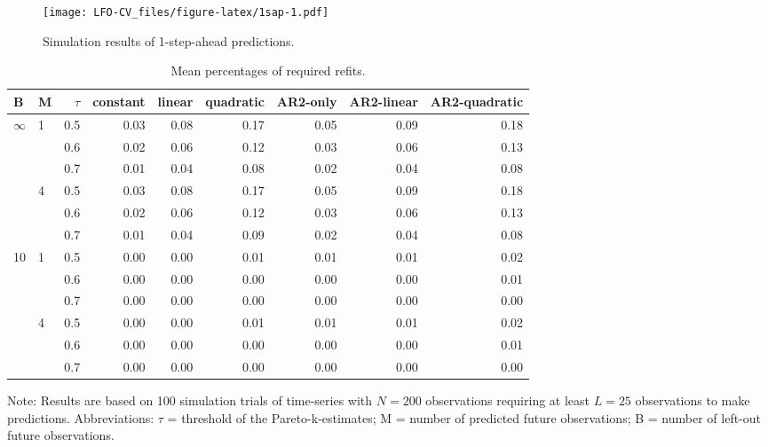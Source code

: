 \documentclass[american,]{article}
\begin{document}
\begin{figure}
\centering
\texttt{[image: LFO-CV\_files/figure-latex/1sap-1.pdf]}
\caption{\label{fig:1sap}Simulation results of 1-step-ahead predictions.}
\end{figure}

\begin{table}[t]

\caption{\label{tab:refits}Mean percentages of required refits.}
\centering
\begin{threeparttable}
\begin{tabular}{llrrrrrrr}
\toprule
B & M & $\tau$ & constant & linear & quadratic & AR2-only & AR2-linear & AR2-quadratic\\
\midrule
$\infty$ & 1 & 0.5 & 0.03 & 0.08 & 0.17 & 0.05 & 0.09 & 0.18\\
 &  & 0.6 & 0.02 & 0.06 & 0.12 & 0.03 & 0.06 & 0.13\\
 &  & 0.7 & 0.01 & 0.04 & 0.08 & 0.02 & 0.04 & 0.08\\
 & 4 & 0.5 & 0.03 & 0.08 & 0.17 & 0.05 & 0.09 & 0.18\\
 &  & 0.6 & 0.02 & 0.06 & 0.12 & 0.03 & 0.06 & 0.13\\
\addlinespace
 &  & 0.7 & 0.01 & 0.04 & 0.09 & 0.02 & 0.04 & 0.08\\
10 & 1 & 0.5 & 0.00 & 0.00 & 0.01 & 0.01 & 0.01 & 0.02\\
 &  & 0.6 & 0.00 & 0.00 & 0.00 & 0.00 & 0.00 & 0.01\\
 &  & 0.7 & 0.00 & 0.00 & 0.00 & 0.00 & 0.00 & 0.00\\
 & 4 & 0.5 & 0.00 & 0.00 & 0.01 & 0.01 & 0.01 & 0.02\\
\addlinespace
 &  & 0.6 & 0.00 & 0.00 & 0.00 & 0.00 & 0.00 & 0.01\\
 &  & 0.7 & 0.00 & 0.00 & 0.00 & 0.00 & 0.00 & 0.00\\
\bottomrule
\end{tabular}
\begin{tablenotes}
\item Note: Results are based on 100 simulation trials of time-series with $N = 200$ observations requiring at least $L = 25$ observations to make predictions. Abbreviations: $\tau$ = threshold of the Pareto-k-estimates; M = number of predicted future observations; B = number of left-out future observations.
\end{tablenotes}
\end{threeparttable}
\end{table}
\end{document}
